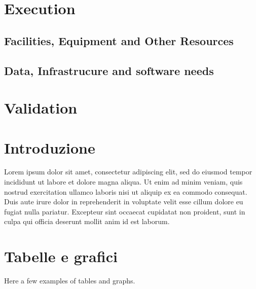 \documentclass{FR16}
\begin{document}
\section{Execution}
\subsection{Facilities, Equipment and Other Resources}
\subsection{Data, Infrastrucure and software needs}



\section{Validation}










\section{Introduzione}
Lorem ipsum dolor sit amet, consectetur adipiscing elit, sed do eiusmod tempor incididunt ut labore et dolore magna aliqua. Ut enim ad minim veniam, quis nostrud exercitation ullamco laboris nisi ut aliquip ex ea commodo consequat. Duis aute irure dolor in reprehenderit in voluptate velit esse cillum dolore eu fugiat nulla pariatur. Excepteur sint occaecat cupidatat non proident, sunt in culpa qui officia deserunt mollit anim id est laborum.
\newpage

\section{Tabelle e grafici}
Here a few examples of tables and graphs.
\end{document}
